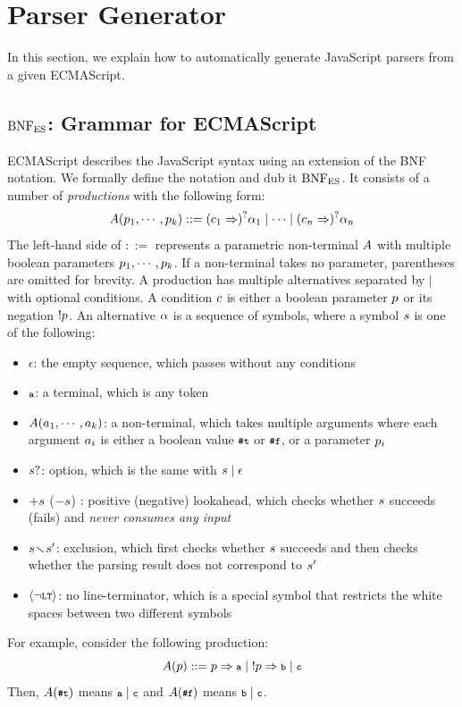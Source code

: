 \section{Parser Generator}\label{sec:parser}
In this section, we explain how to automatically generate JavaScript
parsers from a given ECMAScript.

\subsection{\( \text{BNF}_{\text{ES}} \): Grammar for ECMAScript}
ECMAScript describes the JavaScript syntax using an
extension of the BNF notation.  We formally define the notation and
dub it \( \text{BNF}_{\text{ES}} \).  It consists of a number of \textit{productions}
with the following form:
\[
  A(p_1, \cdots, p_k) ::=
  (c_1 \Rightarrow)^? \alpha_1 \mid
  \cdots \mid
  (c_n \Rightarrow)^? \alpha_n
\]
The left-hand side of $::=$ represents a parametric non-terminal \( A \)
with multiple boolean parameters \( p_1, \cdots, p_k \).
If a non-terminal takes no parameter, parentheses are omitted for brevity.
A production has multiple alternatives separated by $\mid$ with optional conditions.
A condition \( c \) is either a boolean parameter \( p \)
or its negation \( ! p \).  An alternative \( \alpha \) is a sequence
of symbols, where a symbol \( s \) is one of the following:
\begin{itemize}[leftmargin=0.5cm]
\item \( \epsilon \): the empty sequence, which passes without any conditions
\item \( \texttt{\footnotesize a} \): a terminal, which is any token
\item \( A(a_1, \cdots, a_k) \): a non-terminal,
which takes multiple arguments where each argument \( a_i \) is
either a boolean value \( \texttt{\footnotesize\#t} \) or \( \texttt{\footnotesize\#f} \), or a parameter \( p_i \)
\item \( s? \): option, which is the same with \( s \mid \epsilon \)
\item \( +s \) (\( -s \)) : positive (negative) lookahead,
which checks whether \( s \) succeeds (fails) and
\textit{never consumes any input}
\item \( s \!\smallsetminus\! s' \): exclusion, which
first checks whether \( s \) succeeds
and then checks whether the parsing result does not correspond to \( s' \)
\item \( \left<\neg\texttt{\footnotesize LT}\right> \): no line-terminator, which is a special symbol
that restricts the white spaces between two different symbols
\end{itemize}
For example, consider the following production:
\[
  A(p) ::= p \Rightarrow \texttt{\footnotesize a}
  \mid \; !p \Rightarrow \texttt{\footnotesize b}
  \mid  \texttt{\footnotesize c}
\]
Then, \( A(\texttt{\footnotesize\#t}) \) means \( \texttt{\footnotesize a} \mid \texttt{\footnotesize c} \)
and \( A(\texttt{\footnotesize\#f}) \) means \( \texttt{\footnotesize b} \mid \texttt{\footnotesize c} \).

